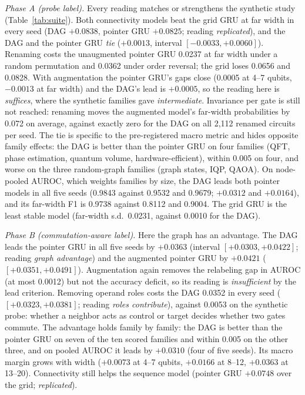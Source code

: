 \documentclass[conference,a4paper]{IEEEtran}
\begin{document}
\emph{Phase A (probe label).} Every reading matches or strengthens the synthetic study (Table~\ref{tab:suite}). Both connectivity models beat the grid GRU at far width in every seed (DAG $+0.0838$, pointer GRU $+0.0825$; reading \emph{replicated}), and the DAG and the pointer GRU \emph{tie} ($+0.0013$, interval $[-0.0033,+0.0060]$). Renaming costs the unaugmented pointer GRU 0.0237 at far width under a random permutation and 0.0362 under order reversal; the grid loses 0.0656 and 0.0828. With augmentation the pointer GRU's gaps close (0.0005 at 4--7 qubits, $-0.0013$ at far width) and the DAG's lead is $+0.0005$, so the reading here is \emph{suffices}, where the synthetic families gave \emph{intermediate}. Invariance per gate is still not reached: renaming moves the augmented model's far-width probabilities by 0.072 on average, against exactly zero for the DAG on all 2,112 renamed circuits per seed. The tie is specific to the pre-registered macro metric and hides opposite family effects: the DAG is better than the pointer GRU on four families (QFT, phase estimation, quantum volume, hardware-efficient), within 0.005 on four, and worse on the three random-graph families (graph states, IQP, QAOA). On node-pooled AUROC, which weights families by size, the DAG leads both pointer models in all five seeds (0.9843 against 0.9532 and 0.9679; $+0.0312$ and $+0.0164$), and its far-width F1 is 0.9738 against 0.8112 and 0.9004. The grid GRU is the least stable model (far-width s.d.\ 0.0231, against 0.0010 for the DAG).

\emph{Phase B (commutation-aware label).} Here the graph has an advantage. The DAG leads the pointer GRU in all five seeds by $+0.0363$ (interval $[+0.0303,+0.0422]$; reading \emph{graph advantage}) and the augmented pointer GRU by $+0.0421$ ($[+0.0351,+0.0491]$). Augmentation again removes the relabeling gap in AUROC (at most 0.0012) but not the accuracy deficit, so its reading is \emph{insufficient} by the lead criterion. Removing operand roles costs the DAG 0.0352 in every seed ($[+0.0323,+0.0381]$; reading \emph{roles contribute}), against 0.0053 on the synthetic probe: whether a neighbor acts as control or target decides whether two gates commute. The advantage holds family by family: the DAG is better than the pointer GRU on seven of the ten scored families and within 0.005 on the other three, and on pooled AUROC it leads by $+0.0310$ (four of five seeds). Its macro margin grows with width ($+0.0073$ at 4--7 qubits, $+0.0166$ at 8--12, $+0.0363$ at 13--20). Connectivity still helps the sequence model (pointer GRU $+0.0748$ over the grid; \emph{replicated}).
\end{document}
